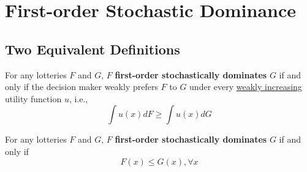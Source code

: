 \documentclass[11pt]{elegantbook}
\begin{document}
\section{First-order Stochastic Dominance}
\subsection{Two Equivalent Definitions}
\begin{definition}
    \normalfont
    For any lotteries $F$ and $G$, $F$ \textbf{first-order stochastically dominates} $G$ if and only if the decision maker weakly prefers $F$ to $G$ under every \underline{weakly increasing} utility function $u$, i.e.,
    $$\int u (x) dF \geq \int u(x) dG$$
\end{definition}

\begin{definition}
    \normalfont
    For any lotteries $F$ and $G$, $F$ \textbf{first-order stochastically dominates} $G$ if and only if
    $$F(x)\leq G(x),\forall x$$
\end{definition}
\end{document}
